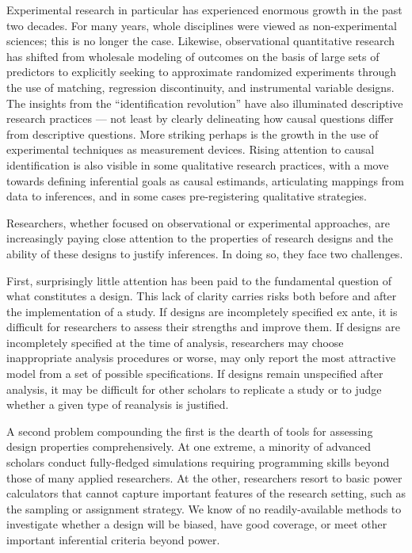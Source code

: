 \documentclass[11pt]{article}
\begin{document}
Experimental research in particular has experienced enormous growth in the past two decades. For many years, whole disciplines were viewed as non-experimental sciences; this is no longer the case. Likewise, observational quantitative research has shifted from wholesale modeling of outcomes on the basis of large sets of predictors to explicitly seeking to approximate randomized experiments through the use of matching, regression discontinuity, and instrumental variable designs. The insights from the ``identification revolution'' have also illuminated descriptive research practices --- not least by clearly delineating how causal questions differ from descriptive questions. More striking perhaps is the growth in the use of experimental techniques as measurement devices. Rising attention to causal identification is also visible in some qualitative research practices, with a move towards defining inferential goals as causal estimands, articulating mappings from data to inferences, and in some cases pre-registering qualitative strategies. 

Researchers, whether focused on observational or experimental approaches, are increasingly paying close attention to the properties of research designs and the ability of these designs to justify inferences. In doing so, they face two challenges.  

First, surprisingly little attention has been paid to the fundamental question of what constitutes a design. This lack of clarity carries risks both before and after the implementation of a study. If designs are incompletely specified ex ante, it is difficult for researchers to assess their strengths and improve them. If designs are incompletely specified at the time of analysis, researchers may choose inappropriate analysis procedures or worse, may only report the most attractive model from a set of possible specifications. If designs remain unspecified after analysis, it may be difficult for other scholars to replicate a study or to judge whether a given type of reanalysis is justified. 

A second problem compounding the first is the dearth of tools for assessing design properties comprehensively. At one extreme, a minority of advanced scholars conduct fully-fledged simulations requiring programming skills beyond those of many applied researchers. At the other, researchers resort to basic power calculators that cannot capture important features of the research setting, such as the sampling or assignment strategy. We know of no readily-available methods to investigate whether a design will be biased, have good coverage, or meet other important inferential criteria beyond power. 
\end{document}
